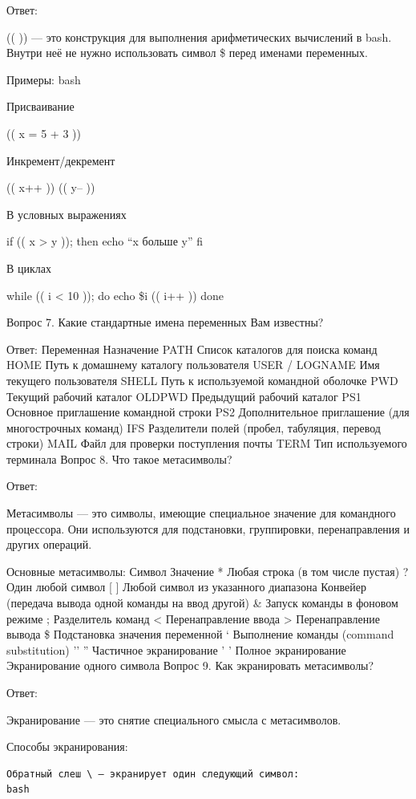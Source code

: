 \documentclass[
  letterpaper,
  DIV=11,
  numbers=noendperiod]{scrartcl}
\begin{document}
Ответ:

(( )) --- это конструкция для выполнения арифметических вычислений в
bash. Внутри неё не нужно использовать символ \$ перед именами
переменных.

Примеры: bash

Присваивание

(( x = 5 + 3 ))

Инкремент/декремент

(( x++ )) (( y-- ))

В условных выражениях

if (( x \textgreater{} y )); then echo ``x больше y'' fi

В циклах

while (( i \textless{} 10 )); do echo \$i (( i++ )) done

Вопрос 7. Какие стандартные имена переменных Вам известны?

Ответ: Переменная Назначение PATH Список каталогов для поиска команд
HOME Путь к домашнему каталогу пользователя USER / LOGNAME Имя текущего
пользователя SHELL Путь к используемой командной оболочке PWD Текущий
рабочий каталог OLDPWD Предыдущий рабочий каталог PS1 Основное
приглашение командной строки PS2 Дополнительное приглашение (для
многострочных команд) IFS Разделители полей (пробел, табуляция, перевод
строки) MAIL Файл для проверки поступления почты TERM Тип используемого
терминала Вопрос 8. Что такое метасимволы?

Ответ:

Метасимволы --- это символы, имеющие специальное значение для командного
процессора. Они используются для подстановки, группировки,
перенаправления и других операций.

Основные метасимволы: Символ Значение * Любая строка (в том числе
пустая) ? Один любой символ {[} {]} Любой символ из указанного диапазона
\textbar{} Конвейер (передача вывода одной команды на ввод другой) \&
Запуск команды в фоновом режиме ; Разделитель команд \textless{}
Перенаправление ввода \textgreater{} Перенаправление вывода \$
Подстановка значения переменной ` \textbar{} Выполнение команды (command
substitution) \textbar{} '' '' Частичное экранирование ' ' Полное
экранирование ~ Экранирование одного символа Вопрос 9. Как экранировать
метасимволы?

Ответ:

Экранирование --- это снятие специального смысла с метасимволов.

Способы экранирования:

\begin{verbatim}
Обратный слеш \ — экранирует один следующий символ:
bash
\end{verbatim}
\end{document}
